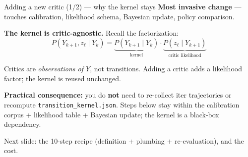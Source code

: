 \documentclass[10pt]{beamer}
\newcommand{\good}[1]{\textcolor{accentGreen}{\textbf{#1}}}
\newcommand{\info}[1]{\textcolor{primaryBlue}{\textbf{#1}}}
\begin{document}
\begin{frame}{Adding a new critic (1/2) --- why the kernel stays}
\vspace{0.15cm}
\info{Most invasive change} --- touches calibration, likelihood schema,
Bayesian update, policy comparison.

\vspace{0.3cm}
\textbf{The kernel is critic-agnostic.} Recall the factorization:
\[
P(Y_{k+1}, z_\ell \mid Y_k) = \underbrace{P(Y_{k+1}\mid Y_k)}_{\text{kernel}} \cdot \underbrace{P(z_\ell\mid Y_{k+1})}_{\text{critic likelihood}}
\]

\vspace{0.15cm}
Critics are \emph{observations of $Y$}, not transitions. Adding a critic adds a
likelihood factor; the kernel is reused unchanged.

\vspace{0.3cm}
\good{Practical consequence:} you do \textbf{not} need to re-collect iter
trajectories or recompute \texttt{transition\_kernel.json}. Steps below stay
within the calibration corpus + likelihood table + Bayesian update; the kernel
is a black-box dependency.

\vspace{0.2cm}
\textcolor{softGrey}{\scriptsize Next slide: the 10-step recipe (definition $+$
plumbing $+$ re-evaluation), and the cost.}
\end{frame}
\end{document}
